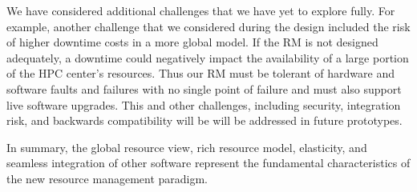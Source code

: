We have considered additional challenges that we
have yet to explore fully. For example,
another challenge that we considered during the design included
the risk of higher downtime costs in a more global model.
If the RM is not designed adequately, a downtime could negatively
impact the availability of a large portion of the HPC center’s
resources. Thus our RM must be tolerant of hardware and software
faults and failures with no single point of failure and must
also support live software upgrades. This and other challenges,
including security, integration risk, and backwards compatibility will be 
will be addressed in future prototypes.

In summary, the global resource view, rich resource model,
elasticity, and seamless integration of other software 
represent the fundamental characteristics of the new
resource management paradigm.  

